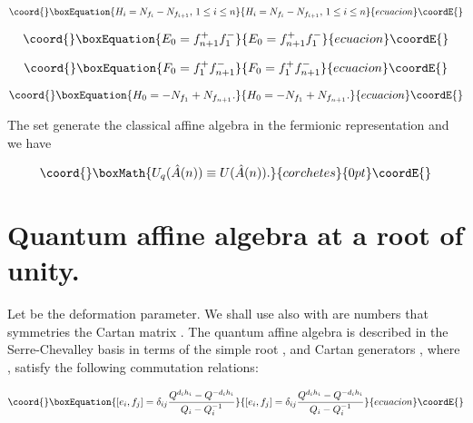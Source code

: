 \documentclass[a4paper,12pt,thmsa]{article}
\begin{document}
\begin{equation}\coord{}\boxEquation{
H_i=N_{f_i}-N_{f_{i+1}},\, 1\leq i\leq n
}{
H_i=N_{f_i}-N_{f_{i+1}},\, 1\leq i\leq n
}{ecuacion}\coordE{}\end{equation}

\begin{equation}\coord{}\boxEquation{
E_0=f_{n+1}^{+}f_1^{-}
}{
E_0=f_{n+1}^{+}f_1^{-}
}{ecuacion}\coordE{}\end{equation}

\begin{equation}\coord{}\boxEquation{
F_{0}=f_{1}^{+}f_{n+1}^{-}
}{
F_{0}=f_{1}^{+}f_{n+1}^{-}
}{ecuacion}\coordE{}\end{equation}

\begin{equation}\coord{}\boxEquation{
H_0=-N_{f_1}+N_{f_{n+1}}.
}{
H_0=-N_{f_1}+N_{f_{n+1}}.
}{ecuacion}\coordE{}\end{equation}

The set \coordHE{}  \myHighlight{$;$}\coordHE{}  \coordHE{} generate the classical affine
algebra \coordHE{} in the fermionic representation and we have

\[\coord{}\boxMath{
U_q(\hat A(n))\equiv U(\hat A(n)).
}{corchetes}{0pt}\coordE{}\]

\section{Quantum affine algebra \coordHE{} at a root of unity.}

Let \coordHE{} be the deformation parameter. We shall use also \coordHE{} with \coordHE{} are numbers that symmetries the Cartan matrix \coordHE{}. The quantum affine algebra \coordHE{} is described in
the Serre-Chevalley basis in terms of the simple root \coordHE{}, \coordHE{} and
Cartan generators \coordHE{}, where \coordHE{}, satisfy the following commutation
relations:

\begin{equation}\coord{}\boxEquation{
\lbrack e_i,f_j]=\delta _{ij}\frac{Q^{d_ih_i}-Q^{-d_ih_i}}{Q_i-Q_i^{-1}}
}{
\lbrack e_i,f_j]=\delta _{ij}\frac{Q^{d_ih_i}-Q^{-d_ih_i}}{Q_i-Q_i^{-1}}
}{ecuacion}\coordE{}\end{equation}
\end{document}
